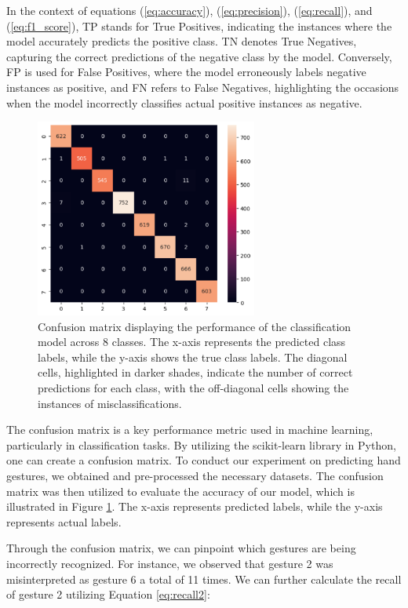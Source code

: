 In the context of equations (\ref{eq:accuracy}), (\ref{eq:precision}), (\ref{eq:recall}), and (\ref{eq:f1_score}), TP stands for True Positives, indicating the instances where the model accurately predicts the positive class. TN denotes True Negatives, capturing the correct predictions of the negative class by the model. Conversely, FP is used for False Positives, where the model erroneously labels negative instances as positive, and FN refers to False Negatives, highlighting the occasions when the model incorrectly classifies actual positive instances as negative.

\begin{figure}[h]
	\centering
	\includegraphics[width = 0.65\textwidth]{images/confusion_matrix.pdf}
	\caption{Confusion matrix displaying the performance of the classification model across 8 classes. The x-axis represents the predicted class labels, while the y-axis shows the true class labels. The diagonal cells, highlighted in darker shades, indicate the number of correct predictions for each class, with the off-diagonal cells showing the instances of misclassifications.}
	\label{fig:confusion_matrix}
\end{figure}


The confusion matrix is a key performance metric used in machine learning, particularly in classification tasks. By utilizing the scikit-learn library in Python, one can create a confusion matrix. To conduct our experiment on predicting hand gestures, we obtained and pre-processed the necessary datasets. The confusion matrix was then utilized to evaluate the accuracy of our model, which is illustrated in Figure \ref{fig:confusion_matrix}. The x-axis represents predicted labels, while the y-axis represents actual labels.

Through the confusion matrix, we can pinpoint which gestures are being incorrectly recognized. For instance, we observed that gesture 2 was misinterpreted as gesture 6 a total of 11 times. We can further calculate the recall of gesture 2 utilizing Equation \ref{eq:recall2}:

